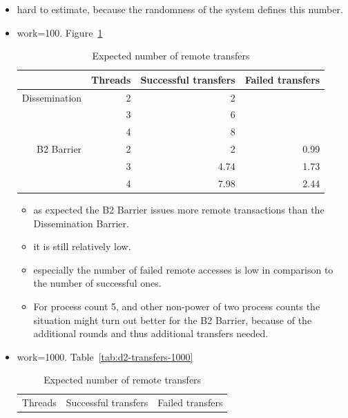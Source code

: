 \documentclass[a4paper, 10pt]{article}
\begin{document}
\begin{itemize}
\begin{itemize}
			\item hard to estimate, because the randomness of the system defines this number.
			\item work=100. Figure~\ref{tab:d2-transfers-100}
				\begin{table}[htbp]
					\centering
					\caption{Expected number of remote transfers}
					\vspace{0.2cm}
					\begin{tabular}{r | r | r r}
						              & Threads & Successful transfers & Failed transfers \\
						\hline
						Dissemination & 2       & 2                     &                 \\
						              & 3       & 6                     &                 \\
						              & 4       & 8                     &                 \\
						\hline
						B2 Barrier    & 2       & 2                     & 0.99            \\
						              & 3       & 4.74                  & 1.73            \\
						              & 4       & 7.98                  & 2.44            \\
					\end{tabular}
					\label{tab:d2-transfers-100}
				\end{table}
				\begin{itemize}
					\item as expected the B2 Barrier issues more remote transactions than the Dissemination Barrier.
					\item it is still relatively low.
					\item especially the number of failed remote accesses is low in comparison to the number of successful ones.
					\item For process count 5, and other non-power of two process counts the situation might turn out better for the B2 Barrier, because of the additional rounds and thus additional transfers needed.
				\end{itemize}
			\item work=1000. Table~\ref{tab:d2-transfers-1000}
				\begin{table}[htbp]
					\centering
					\caption{Expected number of remote transfers}
					\vspace{0.2cm}
					\begin{tabular}{r | r r}
						Threads & Successful transfers & Failed transfers \\

\end{tabular}
\end{table}
\end{itemize}
\end{itemize}
\end{document}
